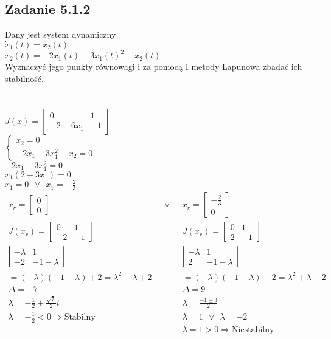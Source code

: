 \subsection*{Zadanie 5.1.2} {\color{darkgray}
	Dany jest system dynamiczny\\
	$\dot{x}_1(t)=x_2(t)$\\
	$\dot{x}_2(t)=-2x_1(t)-3x_1(t)^2-x_2(t)$\\
	Wyznaczyć jego punkty równowagi i za pomocą I metody Lapunowa zbadać ich stabilność.\\
}\lineh
\\\\
$J(x)=\left[ \begin{array}{cc}  0&1\\-2-6x_1 & -1   \end{array}\right]$\\
$\begin{cases}x_2=0\\-2x_1-3x_1^2-x_2=0\end{cases}$\\
$-2x_1-3x_1^2=0$\\
$x_1(2+3x_1)=0$\\
$x_1=0\ \  \vee \ \ x_1=-\frac23$\\
$\begin{array}{lll}
x_r= \left[ \begin{array}{c}   0\\0    \end{array}\right] &\ \ \ \vee \ \ \ & x_r= \left[ \begin{array}{c}   -\frac 23\\0    \end{array}\right] \\
J(x_r)=\left[ \begin{array}{cc}  0&1\\-2&-1    \end{array}\right] && J(x_r)=\left[ \begin{array}{cc}   0&1\\2&-1    \end{array}\right]\\
\left| \begin{array}{cc}  -\lambda & 1 \\-2&-1-\lambda    \end{array}\right|&&\left| \begin{array}{cc}  -\lambda & 1 \\2&-1-\lambda    \end{array}\right|\\
=(-\lambda)(-1-\lambda)+2=\lambda^2+\lambda+2&&=(-\lambda)(-1-\lambda)-2=\lambda^2+\lambda-2\\
\Delta=-7&&\Delta=9\\
\lambda=-\frac 12 \pm \frac{\sqrt 7}{2}i&&\lambda=\frac{-1 \pm 3}{2}\\
\lambda = -\frac 12 <0 \Rightarrow \text{Stabilny} && \lambda = 1 \ \ \vee \ \ \lambda=-2\\
 && \lambda = 1 >0 \Rightarrow \text{Niestabilny}
\end{array}$\\

